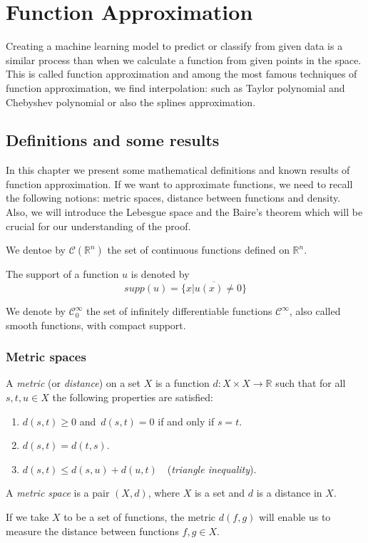\documentclass[../main.tex]{subfiles}
\begin{document}
\chapter{Function Approximation} \label{ch:methods}
\noindent Creating a machine learning model to predict or classify from given data is a similar process than when we calculate a function from given points in the space. This is called function approximation and among the most famous techniques of function approximation, we find interpolation: such as Taylor polynomial and Chebyshev polynomial or also the splines approximation. 

\section{Definitions and some results}
\noindent In this chapter we present some mathematical definitions and known results of function approximation. 
If we want to approximate functions, we need to recall the following notions: metric spaces, distance between functions and density. Also, we will introduce the Lebesgue space and the Baire's theorem which will be crucial for our understanding of the proof. 

\begin{definition} We dentoe by $\mathcal{C}(\mathbb{R}^n)$ the set of continuous functions defined on $\mathbb{R}^n.$
\end{definition}
\begin{definition}
	The support of a function $u$ is denoted by $$supp(u)= \overline{\{x | u(x)\neq 0\}}$$
\end{definition}
\begin{definition} We denote by
	$ \mathcal{C}^\infty_0$ the set of infinitely differentiable functions $\mathcal{C}^\infty$, also called smooth functions, with compact support. 
\end{definition}

\subsection{Metric spaces}
\begin{definition}\label{thm:first}
	A \emph{metric} (or \emph{distance}) on a set $X$ is a function $d:X\times X\rightarrow \mathbb{R} $ such that for all $s,t, u\in X$ the following properties are satisfied:
	\begin{enumerate}
		\item $d(s,t) \geq 0$ and $ \, d(s,t)=0$ if and only if $ s=t$.
		\item $d(s,t)=d(t,s)$.
		\item $d(s,t)\leq d(s,u)+d(u,t)\quad$(\emph{triangle inequality}).
	\end{enumerate}
\begin{definition}
A \emph{metric space} is a pair $(X,d)$, where $X$ is a set and $d$ is a distance in $X$.
\end{definition}
\end{definition}
\noindent  If we take $X$ to be a set of functions, the metric $d(f,g)$ will enable us to measure the distance between functions $f,g \in X$.
\end{document}
